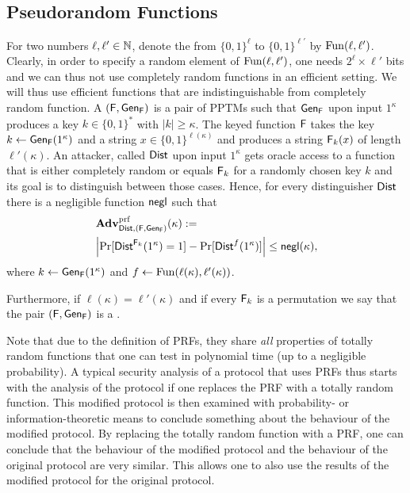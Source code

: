 \subsection*{Pseudorandom Functions}
For two numbers $\ell,\ell'\in \mathbb{N}$, denote the  from
$\{0,1\}^{\ell}$ to $\{0,1\}^{\ell'}$ by $\operatorname{Fun}(\ell,\ell')$. Clearly, in order to
specify a random element of $\operatorname{Fun}(\ell,\ell')$, one needs $2^{\ell}\times \ell'$
bits and we can thus not use completely random functions in an efficient
setting. We will thus use efficient functions that are indistinguishable
from completely random function. A  $(\operatorname{\mathsf{F}},\operatorname{\mathsf{Gen}}_{\operatorname{\mathsf{F}}})$ is a
pair of \acp{PPTM} such that $\operatorname{\mathsf{Gen}}_{\operatorname{\mathsf{F}}}$ upon input $1^{\kappa}$ produces
a key $k\in \{0,1\}^{*}$ with $|k|\geq \kappa$. The keyed function $\operatorname{\mathsf{F}}$
takes the key $k\gets \operatorname{\mathsf{Gen}}_{\operatorname{\mathsf{F}}}(1^{\kappa})$ and a string $x\in
\{0,1\}^{\ell(\kappa)}$ and produces a string $\operatorname{\mathsf{F}}_{k}(x)$ of length
$\ell'(\kappa)$. An attacker, called  $\operatorname{\mathsf{Dist}}$ upon
input $1^{\kappa}$ gets
oracle access to a function that is either completely random or equals
$\operatorname{\mathsf{F}}_{k}$ for a randomly chosen key $k$ and its goal is to distinguish
between those cases. Hence, for every distinguisher $\operatorname{\mathsf{Dist}}$ there is a
negligible function $\operatorname{\mathsf{negl}}$ such that
\begin{align*}
  &\operatorname{\mathbf{Adv}}_{\operatorname{\mathsf{Dist}},(\operatorname{\mathsf{F}},\operatorname{\mathsf{Gen}}_{\operatorname{\mathsf{F}}})}^{\operatorname{prf}}(\kappa) :=\\ &\left| \Pr[\operatorname{\mathsf{Dist}}^{\operatorname{\mathsf{F}}_{k}}(1^{\kappa})=1] -
  \Pr[\operatorname{\mathsf{Dist}}^{f}(1^{\kappa})]\right| \leq \operatorname{\mathsf{negl}}(\kappa),
\end{align*}
where $k\gets \operatorname{\mathsf{Gen}}_{\operatorname{\mathsf{F}}}(1^{\kappa})$ and $f\gets
\operatorname{Fun}(\ell(\kappa),\ell'(\kappa))$. 

Furthermore, if
$\ell(\kappa)=\ell'(\kappa)$ and if every $\operatorname{\mathsf{F}}_{k}$ is a permutation we
say that the pair $(\operatorname{\mathsf{F}},\operatorname{\mathsf{Gen}}_{\operatorname{\mathsf{F}}})$ is a .

Note that due to the definition of \acp{PRF}, they share \emph{all}
properties of totally random functions that one can test in polynomial
time (up to a negligible probability). A typical security analysis of a
protocol that uses \acp{PRF} thus starts with the analysis of the
protocol if one replaces the \ac{PRF} with a totally random
function. This modified protocol is then examined with
probability- or information-theoretic means to conclude something about
the behaviour of the modified protocol. By replacing the totally
random function with a \ac{PRF}, one can conclude that the behaviour of
the modified protocol and the behaviour of the original protocol are
very similar. This allows one to also use the results of the modified
protocol for the original protocol. 


